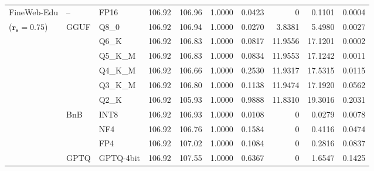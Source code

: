 \begin{longtable}{ll l rrrrrrr}
\midrule
FineWeb-Edu & -- & FP16 & 106.92 & 106.96 & 1.0000 & 0.0423 & \cellcolor{cyan!12} $0$ & 0.1101 & 0.0004 \\
{\small ($\mathbf{r_s{=}0.75}$)} & GGUF & Q8\_0 & 106.92 & 106.94 & 1.0000 & 0.0270 & 3.8381 & 5.4980 & 0.0027 \\
 &  & Q6\_K & 106.92 & 106.83 & 1.0000 & 0.0817 & 11.9556 & 17.1201 & 0.0002 \\
 &  & Q5\_K\_M & 106.92 & 106.83 & 1.0000 & 0.0834 & 11.9553 & 17.1242 & 0.0011 \\
 &  & Q4\_K\_M & 106.92 & 106.66 & 1.0000 & 0.2530 & 11.9317 & 17.5315 & 0.0115 \\
 &  & Q3\_K\_M & 106.92 & 106.80 & 1.0000 & 0.1138 & 11.9474 & 17.1920 & 0.0562 \\
 &  & Q2\_K & 106.92 & 105.93 & 1.0000 & 0.9888 & 11.8310 & 19.3016 & 0.2031 \\
 & BnB & INT8 & 106.92 & 106.93 & 1.0000 & 0.0108 & \cellcolor{cyan!12} $0$ & 0.0279 & 0.0078 \\
 &  & NF4 & 106.92 & 106.76 & 1.0000 & 0.1584 & \cellcolor{cyan!12} $0$ & 0.4116 & 0.0474 \\
 &  & FP4 & 106.92 & 107.02 & 1.0000 & 0.1084 & \cellcolor{cyan!12} $0$ & 0.2816 & 0.0837 \\
 & GPTQ & GPTQ-4bit & 106.92 & 107.55 & 1.0000 & 0.6367 & \cellcolor{cyan!12} $0$ & 1.6547 & 0.1425 \\
\end{longtable}
\endgroup